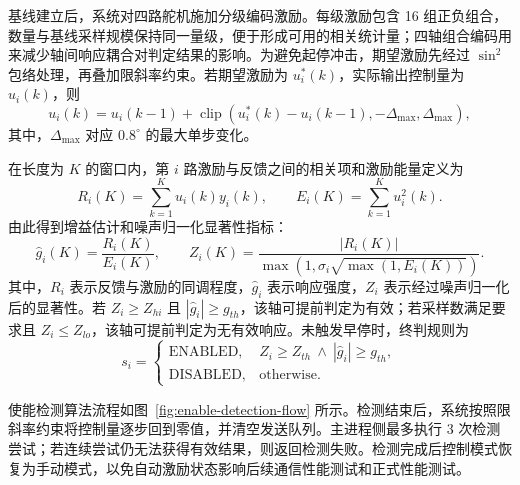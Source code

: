 基线建立后，系统对四路舵机施加分级编码激励。每级激励包含 16 组正负组合，数量与基线采样规模保持同一量级，便于形成可用的相关统计量；四轴组合编码用来减少轴间响应耦合对判定结果的影响。为避免起停冲击，期望激励先经过 $\sin^2$ 包络处理，再叠加限斜率约束。若期望激励为 $u_i^\ast(k)$，实际输出控制量为 $u_i(k)$，则
\begin{equation}
  u_i(k)=u_i(k-1)+\operatorname{clip}\left(u_i^\ast(k)-u_i(k-1),-\Delta_{\max},\Delta_{\max}\right),
\end{equation}
其中，$\Delta_{\max}$ 对应 $0.8^\circ$ 的最大单步变化。

在长度为 $K$ 的窗口内，第 $i$ 路激励与反馈之间的相关项和激励能量定义为
\begin{equation}
  R_i(K)=\sum_{k=1}^{K}u_i(k)y_i(k),\qquad E_i(K)=\sum_{k=1}^{K}u_i^2(k).
\end{equation}
由此得到增益估计和噪声归一化显著性指标：
\begin{equation}
  \hat g_i(K)=\frac{R_i(K)}{E_i(K)},\qquad
  Z_i(K)=\frac{|R_i(K)|}{\max\left(1,\sigma_i\sqrt{\max(1,E_i(K))}\right)}.
\end{equation}
其中，$R_i$ 表示反馈与激励的同调程度，$\hat g_i$ 表示响应强度，$Z_i$ 表示经过噪声归一化后的显著性。若 $Z_i\ge Z_{hi}$ 且 $|\hat g_i|\ge g_{th}$，该轴可提前判定为有效；若采样数满足要求且 $Z_i\le Z_{lo}$，该轴可提前判定为无有效响应。未触发早停时，终判规则为
\begin{equation}
  s_i=
  \begin{cases}
    \mathrm{ENABLED}, & Z_i\ge Z_{th}\ \land\ |\hat g_i|\ge g_{th},\\
    \mathrm{DISABLED}, & \text{otherwise}.
  \end{cases}
\end{equation}

使能检测算法流程如图~\ref{fig:enable-detection-flow} 所示。检测结束后，系统按照限斜率约束将控制量逐步回到零值，并清空发送队列。主进程侧最多执行 3 次检测尝试；若连续尝试仍无法获得有效结果，则返回检测失败。检测完成后控制模式恢复为手动模式，以免自动激励状态影响后续通信性能测试和正式性能测试。

